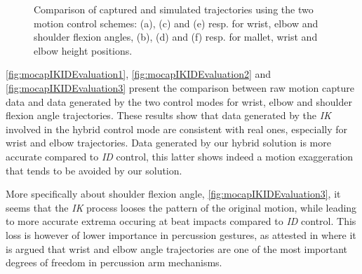\begin{figure}
\begin{center}
		\hspace{6mm}
	\end{center}
	\vspace{-0.6cm}
	\caption[Comparison of captured and simulated trajectories]{Comparison of captured and simulated trajectories using the two motion control schemes: (a), (c) and (e) resp. for wrist, elbow and shoulder flexion angles, (b), (d) and (f) resp. for mallet, wrist and elbow height positions.}
	\label{fig:mocapIKIDEvaluation}
\end{figure}

\myfigname \ref{fig:mocapIKIDEvaluation1}, \ref{fig:mocapIKIDEvaluation2} and \ref{fig:mocapIKIDEvaluation3} present the comparison between raw motion capture data and data generated by the two control modes for wrist, elbow and shoulder flexion angle trajectories. These results show that data generated by the \emph{IK} involved in the hybrid control mode are consistent with real ones, especially for wrist and elbow trajectories. Data generated by our hybrid solution is more accurate compared to \emph{ID} control, this latter shows indeed a motion exaggeration that tends to be avoided by our solution.

More specifically about shoulder flexion angle, \myfigname \ref{fig:mocapIKIDEvaluation3}, it seems that the \emph{IK} process looses the pattern of the original motion, while leading to more accurate extrema occuring at beat impacts compared to \emph{ID} control. This loss is however of lower importance in percussion gestures, as attested in \cite{bouenard:ENACTIVE08} where it is argued that wrist and elbow angle trajectories are one of the most important degrees of freedom in percussion arm mechanisms.\\
 
